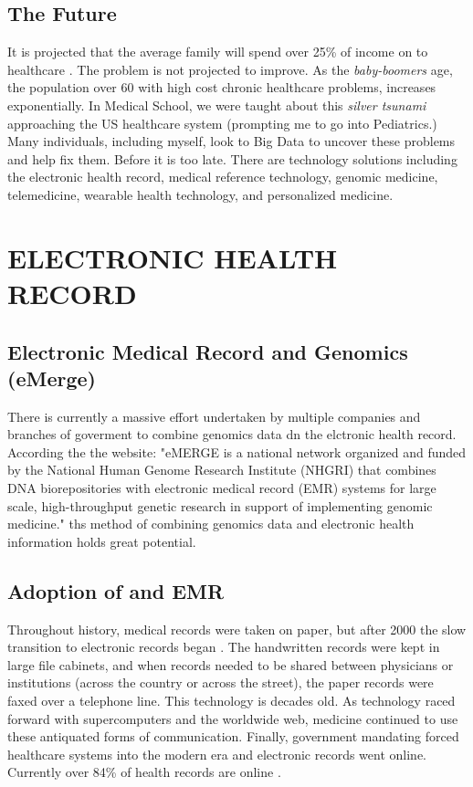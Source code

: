 \documentclass[sigconf]{acmart}
\begin{document}
\subsection{The Future}

It is projected that the average family will spend over 25\% of income
on to healthcare \cite{fox6}.  The problem is not projected to improve.  As
the {\em baby-boomers} age, the population over 60 with high cost chronic
healthcare problems, increases exponentially.  In Medical School, we
were taught about this {\em silver tsunami} approaching the US healthcare
system (prompting me to go into Pediatrics.)  Many individuals,
including myself, look to Big Data to uncover these problems and help
fix them. Before it is too late.  There are technology solutions
including the electronic health record, medical reference technology,
genomic medicine, telemedicine, wearable health technology, and
personalized medicine.


\section{ELECTRONIC HEALTH RECORD}
\subsection{Electronic Medical Record and Genomics (eMerge)}
There is currently a massive effort undertaken by multiple companies and branches of goverment to combine genomics data dn the elctronic health record.  According the the website:  "eMERGE is a national network organized and funded by the National Human Genome Research Institute (NHGRI) that combines DNA biorepositories with electronic medical record (EMR) systems for large scale, high-throughput genetic research in support of implementing genomic medicine."  ths method of combining genomics data and electronic health information holds great potential.  

\subsection{Adoption of and EMR}

Throughout history, medical records were taken on paper, but after
2000 the slow transition to electronic records began
\cite{kokkonen2013use}. The handwritten records were kept in large
file cabinets, and when records needed to be shared between physicians
or institutions (across the country or across the street), the paper
records were faxed over a telephone line.  This technology is decades
old.  As technology raced forward with supercomputers and the
worldwide web, medicine continued to use these antiquated forms of
communication.  Finally, government mandating forced healthcare
systems into the modern era and electronic records went online.
Currently over 84\% of health records are online \cite{fox6}.
\end{document}
